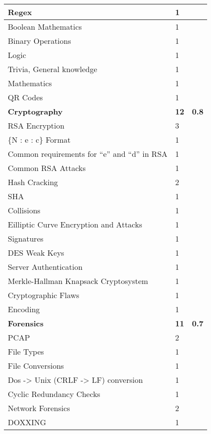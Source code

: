 \documentclass[a4paper,11pt]{report}
\begin{document}
\begin{center}
\begin{longtable}{| l | l | l |}
					\quad Regex & 1 & \\ \hline 
					\quad Boolean Mathematics & 1 & \\ \hline 
					\quad Binary Operations & 1 & \\ \hline 
					\quad Logic & 1 & \\ \hline 
					\quad Trivia, General knowledge & 1 & \\ \hline 
					\quad Mathematics & 1 & \\ \hline 
					\quad QR Codes & 1 & \\ \hline 
					\textbf{Cryptography} & \textbf{12} & \textbf{0.8} \\ \hline 
					\quad RSA Encryption & 3 & \\ \hline
						\qquad \{N : e : c\} Format & 1 & \\ \hline
						\qquad Common requirements for ``e'' and ``d'' in RSA & 1 & \\ \hline
						\qquad Common RSA Attacks & 1 & \\ \hline 
					\quad Hash Cracking & 2 & \\ \hline
						\qquad SHA & 1 & \\ \hline 
						\qquad Collisions & 1 & \\ \hline 
					\quad Eilliptic Curve Encryption and Attacks & 1 & \\ \hline 
					\quad Signatures & 1 & \\ \hline 
					\quad DES Weak Keys & 1 & \\ \hline 
					\quad Server Authentication & 1 & \\ \hline
					\quad Merkle-Hallman Knapsack Cryptosystem & 1 & \\ \hline
					\quad Cryptographic Flaws & 1 & \\ \hline 
					\quad Encoding & 1 & \\ \hline 
					\textbf{Forensics} & \textbf{11} & \textbf{0.7}\\ \hline
					\quad PCAP & 2 & \\ \hline
					\quad File Types & 1 & \\ \hline
					\quad File Conversions & 1 & \\ \hline 
					\quad Dos -> Unix (CRLF -> LF) conversion & 1 & \\ \hline 
					\quad Cyclic Redundancy Checks & 1 & \\ \hline
					\quad Network Forensics & 2 & \\ \hline 
					\quad DOXXING & 1 & \\ \hline 

\end{longtable}
\end{center}
\end{document}
